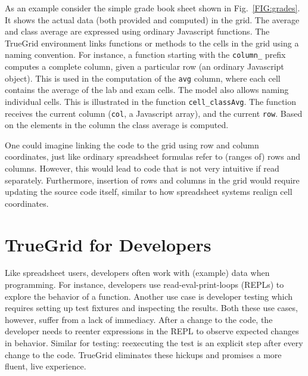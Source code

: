 \documentclass{llncs}
\begin{document}
As an example consider the simple grade book sheet shown in Fig.~\ref{FIG:grades}. It shows the actual data (both provided and computed) in the grid. The average and class average are expressed using ordinary Javascript functions. The TrueGrid environment links functions or methods to the cells in the grid using a naming convention.
For instance, a function starting with the \lstinline{column_} prefix computes a complete column, given a particular row (an ordinary Javascript object).
This is used in the computation of the \lstinline{avg} column, where each cell contains the average of the lab and exam cells.
The model also allows naming individual cells. This is illustrated in the function \lstinline{cell_classAvg}. The function receives the current column (\lstinline{col}, a Javascript array), and the current \lstinline{row}. Based on the elements in the column the class average is computed. 

One could imagine linking the code to the grid using row and column coordinates, just like ordinary spreadsheet formulas refer to (ranges of) rows and columns. However, this would lead to code that is not very intuitive if read separately. Furthermore,  insertion of rows and columns in the grid would require updating the source code itself, similar to how spreadsheet systems realign cell coordinates. 


\section{TrueGrid for Developers}
\label{SECT:dev} 

Like spreadsheet users, developers often work with (example) data when programming. For instance, developers use read-eval-print-loops (REPLs) to explore the behavior of a function. 
Another use case is developer testing which requires setting up test fixtures and inspecting the results.
Both these use cases, however, suffer from a lack of immediacy. After a change to the code, the developer needs to reenter expressions in the REPL to observe expected changes in behavior. Similar for testing: reexecuting the test is an explicit step after every change to the code. TrueGrid  eliminates these hickups and promises a more fluent, live experience. 
\end{document}
